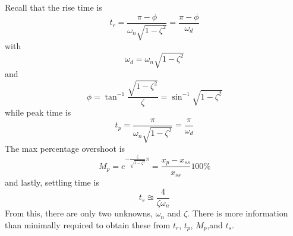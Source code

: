\documentclass[12pt,letter]{article}
\begin{document}
Recall that the rise time is
\begin{equation}
t_r = \frac{\pi - \phi}{\omega_n \sqrt{1-\zeta^2}} = \frac{\pi - \phi}{\omega_d}
\end{equation}
with
\begin{equation}
\omega_d = \omega_n \sqrt{1-\zeta^2}
\end{equation}
and
\begin{equation}
\phi = \tan^{-1} \frac{\sqrt{1-\zeta^2}}{\zeta} = \sin^{-1} \sqrt{1-\zeta^2}
\end{equation}
while peak time is
\begin{equation}
t_p = \frac{\pi}{\omega_n \sqrt{1-\zeta^2}} = \frac{\pi}{\omega_d}
\end{equation}
The max percentage overshoot is
\begin{equation}
M_p  = e^{- \frac{\zeta}{\sqrt{1-\zeta^2}} \pi }= \frac{x_p - x_{ss}}{x_{ss}} 100\%
\end{equation}
and lastly, settling time is
\begin{equation}
t_s \approxeq \frac{4}{\zeta \omega_n}
\end{equation}
From this, there are only two unknowns, $\omega_n$ and $\zeta$. There is more information than minimally required to obtain these from $t_r$, $t_p$, $M_p$,and $t_s$.
\end{document}
